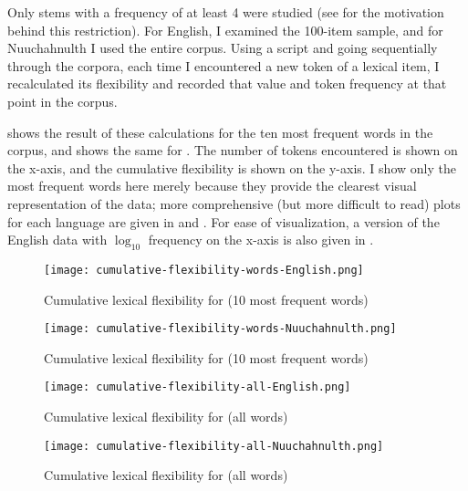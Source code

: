 Only stems with a frequency of at least 4 were studied (see  for the motivation behind this restriction). For English, I examined the 100-item sample, and for Nuuchahnulth I used the entire corpus. Using a script and going sequentially through the corpora, each time I encountered a new token of a lexical item, I recalculated its flexibility and recorded that value and token frequency at that point in the corpus.

 shows the result of these calculations for the ten most frequent words in the  corpus, and  shows the same for . The number of tokens encountered is shown on the x-axis, and the cumulative flexibility is shown on the y-axis. I show only the most frequent words here merely because they provide the clearest visual representation of the data; more comprehensive (but more difficult to read) plots for each language are given in  and . For ease of visualization, a version of the English data with $\log_{10}$ frequency on the x-axis is also given in .

\begin{figure}[h!]
  \centering
  \caption{Cumulative lexical flexibility for  (10 most frequent words)}
  \label{fig:cumulative-flexibility-words-English}
  \texttt{[image: cumulative-flexibility-words-English.png]}
\end{figure}

\begin{figure}[h!]
  \centering
  \caption{Cumulative lexical flexibility for  (10 most frequent words)}
  \label{fig:cumulative-flexibility-words-Nuuchahnulth}
  \texttt{[image: cumulative-flexibility-words-Nuuchahnulth.png]}
\end{figure}

\begin{figure}[h!]
  \centering
  \caption{Cumulative lexical flexibility for  (all words)}
  \label{fig:cumulative-flexibility-all-English}
  \texttt{[image: cumulative-flexibility-all-English.png]}
\end{figure}

\begin{figure}[h!]
  \centering
  \caption{Cumulative lexical flexibility for  (all words)}
  \label{fig:cumulative-flexibility-all-Nuuchahnulth}
  \texttt{[image: cumulative-flexibility-all-Nuuchahnulth.png]}
\end{figure}


